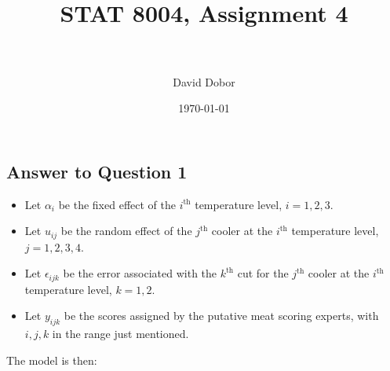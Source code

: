 \documentclass[paper=a4, fontsize=11pt]{scrartcl} %
\title{	
\normalfont \normalsize 
\horrule{0.5pt} \\[0.4cm] %
\huge STAT 8004, Assignment 4 \\ %
\horrule{2pt} \\[0.5cm] %
}
\author{David Dobor}
\date{\normalsize\today} %
\begin{document}
\maketitle 

\subsection*{Answer to Question 1}
\begin{itemize}
\item Let $\alpha_i$ be the fixed effect of the $i^{\text{th}}$ temperature level,  $i = 1, 2, 3$. 
\item Let $u_{ij}$ be the random effect of the $j^{\text{th}}$ cooler at the  $i^{\text{th}}$ temperature level, $j = 1,2,3,4$.
\item Let $\epsilon_{ijk}$ be the error associated with the $k^{\text{th}}$ cut for the $j^{\text{th}}$ cooler at the  $i^{\text{th}}$ temperature level,  $k = 1, 2$. 
\item Let $y_{ijk}$ be the scores assigned by the putative meat scoring experts, with $i, j, k$ in the range just mentioned.
\end{itemize}

The model is then:
\end{document}
